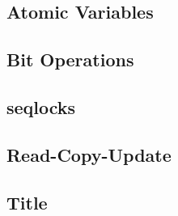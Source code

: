 \documentclass{beamer}
\begin{document}
\subsection{Atomic Variables}

\subsection{Bit Operations}

\subsection{seqlocks}

\subsection{Read-Copy-Update}

\subsection{Title}

\end{document}
